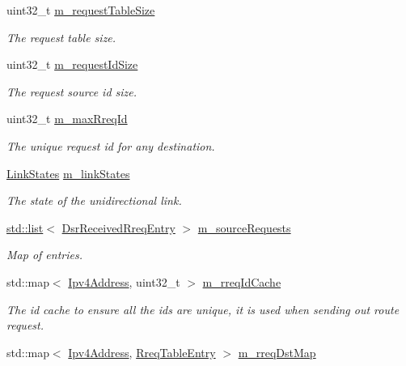 \begin{DoxyCompactItemize}
uint32\+\_\+t \hyperlink{classns3_1_1dsr_1_1DsrRreqTable_aa0a03f05e32aa1ac047ad091154e8215}{m\+\_\+request\+Table\+Size}
\begin{DoxyCompactList}\small\item\em The request table size. \end{DoxyCompactList}\item 
uint32\+\_\+t \hyperlink{classns3_1_1dsr_1_1DsrRreqTable_abc5546adc8c2dd2b434f583a5c8299d9}{m\+\_\+request\+Id\+Size}
\begin{DoxyCompactList}\small\item\em The request source id size. \end{DoxyCompactList}\item 
uint32\+\_\+t \hyperlink{classns3_1_1dsr_1_1DsrRreqTable_a8f382a2a8f2b211480187ea2520dc936}{m\+\_\+max\+Rreq\+Id}
\begin{DoxyCompactList}\small\item\em The unique request id for any destination. \end{DoxyCompactList}\item 
\hyperlink{namespacens3_1_1dsr_ac9e5787558472a1653f08327f988425f}{Link\+States} \hyperlink{classns3_1_1dsr_1_1DsrRreqTable_a40714429405484d753e0b435e4470e2d}{m\+\_\+link\+States}
\begin{DoxyCompactList}\small\item\em The state of the unidirectional link. \end{DoxyCompactList}\item 
\hyperlink{openflow-interface_8h_afd9bcfa176617760671b67580f536fa7}{std\+::list}$<$ \hyperlink{classns3_1_1dsr_1_1DsrReceivedRreqEntry}{Dsr\+Received\+Rreq\+Entry} $>$ \hyperlink{classns3_1_1dsr_1_1DsrRreqTable_a94a67c0dad622c5db48c7e5626addceb}{m\+\_\+source\+Requests}
\begin{DoxyCompactList}\small\item\em Map of entries. \end{DoxyCompactList}\item 
std\+::map$<$ \hyperlink{classns3_1_1Ipv4Address}{Ipv4\+Address}, uint32\+\_\+t $>$ \hyperlink{classns3_1_1dsr_1_1DsrRreqTable_a320d3d557c1ea9963868fb9d2efbe3a5}{m\+\_\+rreq\+Id\+Cache}
\begin{DoxyCompactList}\small\item\em The id cache to ensure all the ids are unique, it is used when sending out route request. \end{DoxyCompactList}\item 
std\+::map$<$ \hyperlink{classns3_1_1Ipv4Address}{Ipv4\+Address}, \hyperlink{structns3_1_1dsr_1_1RreqTableEntry}{Rreq\+Table\+Entry} $>$ \hyperlink{classns3_1_1dsr_1_1DsrRreqTable_a7cb611a29059faab6ffb9532e15d4166}{m\+\_\+rreq\+Dst\+Map}

\end{DoxyCompactItemize}
